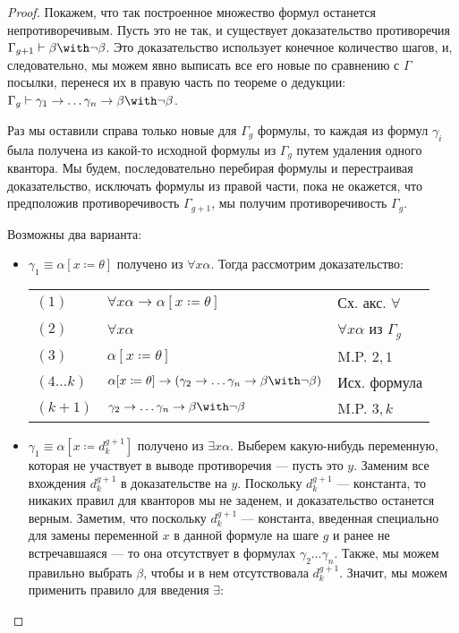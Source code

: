 \begin{proof}
Покажем, что так построенное множество формул останется
непротиворечивым. Пусть это не так, и существует доказательство
противоречия $\Gamma_{g+1} \vdash \beta \with \neg\beta$. Это доказательство
использует конечное количество шагов, и, следовательно, мы можем явно
выписать все его новые по сравнению с $\Gamma$ посылки, 
перенеся их в правую часть по теореме о
дедукции: $\Gamma_g \vdash \gamma_1 \rightarrow \dots \gamma_n \rightarrow \beta \with \neg\beta$.

Раз мы оставили справа только новые для $\Gamma_g$ формулы,
то каждая из формул $\gamma_i$ была получена из какой-то исходной формулы 
из $\Gamma_g$ путем удаления одного квантора. Мы будем, последовательно перебирая
формулы и перестраивая доказательство,
исключать формулы из правой части, пока не окажется, что предположив противоречивость
$\Gamma_{g+1}$, мы получим противоречивость $\Gamma_g$.

Возможны два варианта:
\begin{itemize}
\item $\gamma_1 \equiv \alpha[x \coloneqq  \theta]$ 
получено из $\forall x \alpha$. Тогда рассмотрим доказательство:

\begin{tabular}{lll}
$(1)$ & $\forall x \alpha \rightarrow \alpha [x \coloneqq  \theta]$ & Сх. акс. $\forall$\\
$(2)$ & $\forall x \alpha$ & $\forall x \alpha$ из $\Gamma_g$\\
$(3)$ & $\alpha [x \coloneqq  \theta]$ & M.P. $2,1$\\
$(4 \dots k)$ & $\alpha [x \coloneqq  \theta] \rightarrow (\gamma_2 \rightarrow \dots \gamma_n \rightarrow \beta \with \neg \beta)$ & Исх. формула\\
$(k+1)$ & $\gamma_2 \rightarrow \dots \gamma_n \rightarrow \beta \with \neg \beta$ & M.P. $3,k$
\end{tabular}

\item $\gamma_1 \equiv \alpha[x \coloneqq  d_k^{g+1}]$ получено из $\exists x \alpha$.
Выберем какую-нибудь переменную, которая не участвует в выводе противоречия --- пусть это $y$.
Заменим все вхождения $d_k^{g+1}$ в доказательстве на $y$. Поскольку
$d_k^{g+1}$ --- константа, то никаких правил для кванторов мы не заденем, и доказательство
останется верным.
Заметим, что поскольку $d_k^{g+1}$ --- константа, введенная специально для замены 
переменной $x$ в данной формуле на шаге $g$
и ранее не встречавшаяся --- то она отсутствует в формулах $\gamma_2 \dots \gamma_n$.
Также, мы можем правильно выбрать $\beta$, чтобы и в нем отсутствовала $d_k^{g+1}$.
Значит, мы можем применить правило для введения $\exists$:


\end{itemize}
\end{proof}
